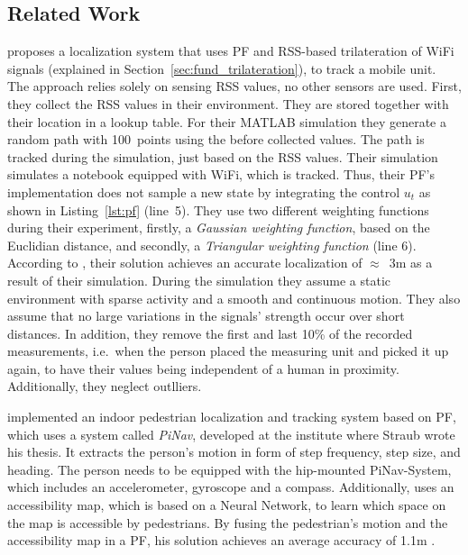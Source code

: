 \subsection{Related Work}

\citet{Siddiqui:tracking} proposes a localization system that uses \ac{PF} and \ac{RSS}-based trilateration of WiFi signals (explained in Section~\ref{sec:fund_trilateration}), to track a mobile unit. The approach relies solely on sensing \ac{RSS} values, no other sensors are used. First, they collect the \ac{RSS} values in their environment. They are stored together with their location in a lookup table. For their MATLAB simulation they generate a random path with 100~points using the before collected values. The path is tracked during the simulation, just based on the \ac{RSS} values. Their simulation simulates a notebook equipped with WiFi, which is tracked. Thus, their \ac{PF}'s implementation does not sample a new state by integrating the control $u_t$ as shown in Listing~\ref{lst:pf} (line~5). They use two different weighting functions during their experiment, firstly, a \emph{Gaussian weighting function}, based on the Euclidian distance, and secondly, a \emph{Triangular weighting function} (line 6). According to \citet{Siddiqui:tracking}, their solution achieves an accurate localization of $\approx$~3m as a result of their simulation. During the simulation they assume a static environment with sparse activity and a smooth and continuous motion. They also assume that no large variations in the signals' strength occur over short distances. In addition, they remove the first and last 10\% of the recorded measurements, i.e.\ when the person placed the measuring unit and picked it up again, to have their values being independent of a human in proximity. Additionally, they neglect outlliers.

\citet{straub:pf} implemented an indoor pedestrian localization and tracking system based on \ac{PF}, which uses a system called \emph{PiNav}, developed at the institute where Straub wrote his thesis. It extracts the person's motion in form of step frequency, step size, and heading. The person needs to be equipped with the hip-mounted PiNav-System, which includes an accelerometer, gyroscope and a compass. Additionally, \citet{straub:pf} uses an accessibility map, which is based on a Neural Network, to learn which space on the map is accessible by pedestrians. By fusing the pedestrian's motion and the accessibility map in a \ac{PF}, his solution achieves an average accuracy of 1.1m \citep{straub:pf}.

